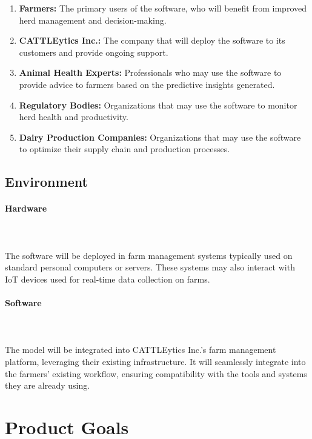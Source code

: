 \documentclass{article}
\begin{document}
\begin{enumerate}
    \item \textbf{Farmers:} The primary users of the software, who will benefit 
    from improved herd management and decision-making.
    \item \textbf{CATTLEytics Inc.:} The company that will deploy the software 
    to its customers and provide ongoing support.
    \item \textbf{Animal Health Experts:} Professionals who may use the 
    software to provide advice to farmers based on the predictive insights 
    generated.
    \item \textbf{Regulatory Bodies:} Organizations that may use the software 
    to monitor herd health and productivity.
    \item \textbf{Dairy Production Companies:} Organizations that may use the 
    software to optimize their supply chain and production processes.
\end{enumerate}


\subsection{Environment}

\paragraph{Hardware} \ \\
\\
The software will be deployed in farm management systems typically used on 
standard personal computers or servers. These systems may also interact with 
IoT devices used for real-time data collection on farms.
\paragraph{Software} \ \\
\\
The model will be integrated into CATTLEytics Inc.'s farm management platform,
leveraging their existing infrastructure. It will seamlessly integrate into 
the farmers' existing workflow, ensuring compatibility with the tools and 
systems they are already using.

\section{Product Goals}
\end{document}
